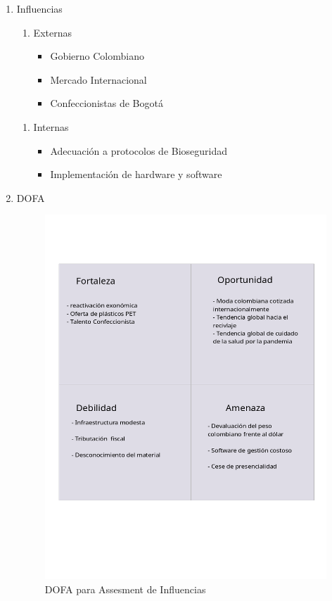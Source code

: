 \documentclass[11pt]{article}
\begin{document}
\begin{enumerate}
\item Influencias
\label{sec:orge474aff}

\begin{enumerate}
\item Externas

\begin{itemize}
\item Gobierno Colombiano
\item Mercado Internacional
\item Confeccionistas de Bogotá
\end{itemize}
\end{enumerate}


\begin{enumerate}
\item Internas

\begin{itemize}
\item Adecuación a protocolos de Bioseguridad
\item Implementación de hardware y software
\end{itemize}
\end{enumerate}

\item DOFA
\label{sec:orgfce53f4}
\begin{figure}[H]
\centering
\includegraphics[width=.9\linewidth]{./assets/build/dofa.png}
\caption{\label{fig:org3d53f5c}DOFA para Assesment de Influencias}
\end{figure}
\end{enumerate}
\end{document}
